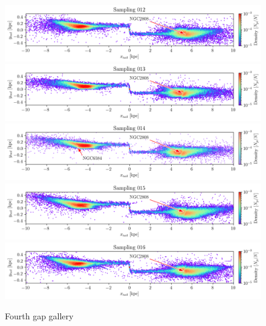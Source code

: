 \documentclass{aa}
\begin{document}
\begin{appendix}
    \begin{figure}
      \centering
      \includegraphics[width=\linewidth]{gallery_of_gaps_monte-carlo-012.png}
      \includegraphics[width=\linewidth]{gallery_of_gaps_monte-carlo-013.png}
      \includegraphics[width=\linewidth]{gallery_of_gaps_monte-carlo-014.png}      
      \includegraphics[width=\linewidth]{gallery_of_gaps_monte-carlo-015.png}
      \includegraphics[width=\linewidth]{gallery_of_gaps_monte-carlo-016.png}
      \caption{Fourth gap gallery}
      \label{fig:gallery3}
      \end{figure}        


\end{appendix}
\end{document}
